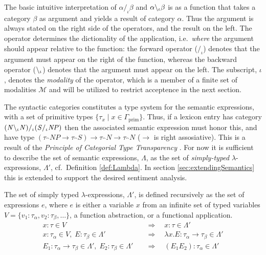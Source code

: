 The basic intuitive interpretation of $\alpha /_\iota \beta$ and $\alpha \backslash_\iota \beta$ is as a function that takes a category $\beta$ as argument and yields a result of category $\alpha$. Thus the argument is always stated on the right side of the operators, and the result on the left. The operator determines the dictionality of the application, i.e.\ \emph{where} the argument should appear relative to the function: the forward operator ($/_\iota$) denotes that the argument must appear on the right of the function, whereas the backward operator ($\backslash_\iota$) denotes that the argument must appear on the left. The subscript, $\iota$, denotes the \emph{modality} of the operator, which is a member of a finite set of modalities $\mathcal{M}$ and will be utilized to restrict acceptence in the next section. 

The syntactic categories constitutes a type system for the semantic expressions, with a set of primitive types $\{ \tau_x \; | \; x \in \Gamma_\mathrm{prim} \}$. Thus, if a lexicon entry has category $({\mathit{N}} \backslash_\iota {\mathit{N}}) /_\iota ({\mathit{S}} /_\iota {\mathit{NP}})$ then the associated semantic expression must honor this, and have type $(\tau_\cat{NP} \to \tau_\cat{S}) \to \tau_\cat{N} \to \tau_\cat{N}$ ($\to$ is right assosiative). This is a result of the \emph{Principle of Categorial Type Transparency} \cite[Montague, 1974]{??}. For now it is sufficient to describe the set of semantic expressions, $\Lambda$, as the set of \emph{simply-typed} $\lambda$-expressions, $\Lambda'$, cf.\ Definition \ref{def:Lambda}. In section \ref{sec:extendingSemantics} this is extended to support the desired sentiment analysis.

\begin{definition}
The set of simply typed $\lambda$-expressions, $\Lambda'$, is defined recursively as the set of expressions $e$, where $e$ is either a variable $x$ from an infinite set of typed variables $V = \{ v_1 : \tau_\alpha, v_2 : \tau_\beta, \ldots \}$, a function abstraction, or a functional application.
\begin{align}
 x : \tau \in V                          &\quad \Rightarrow \quad  x  : \tau \in \Lambda' \tag{Variable} \\
 x : \tau_\alpha \in V, \; E : \tau_\beta \in \Lambda'          &\quad \Rightarrow \quad  \lambda x . E : \tau_\alpha \to \tau_\beta \in \Lambda' \tag{Abstraction} \\
 E_1 : \tau_\alpha \to \tau_\beta \in \Lambda', \; E_2 : \tau_\beta \in \Lambda'   &\quad \Rightarrow \quad  (E_1 E_2) : \tau_\alpha \in \Lambda' \tag{Application} 
 \label{eq:Lambda}
\end{align}
\label{def:Lambda}
\done
\end{definition}

